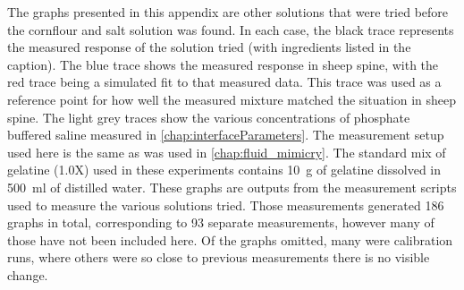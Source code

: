 The graphs presented in this appendix are other solutions that were tried before the cornflour and salt solution was found.
In each case, the black trace represents the measured response of the solution tried (with ingredients listed in the caption).
The blue trace shows the measured response in sheep spine, with the red trace being a simulated fit to that measured data.
This trace was used as a reference point for how well the measured mixture matched the situation in sheep spine.
The light grey traces show the various concentrations of phosphate buffered saline measured in \cref{chap:interfaceParameters}.
The measurement setup used here is the same as was used in \cref{chap:fluid_mimicry}.
The standard mix of gelatine (1.0X) used in these experiments contains \SI{10}{\gram} of gelatine dissolved in \SI{500}{\milli\litre} of distilled water.
These graphs are outputs from the measurement scripts used to measure the various solutions tried.
Those measurements generated 186 graphs in total, corresponding to 93 separate measurements, however many of those have not been included here.
Of the graphs omitted, many were calibration runs, where others were so close to previous measurements there is no visible change.


